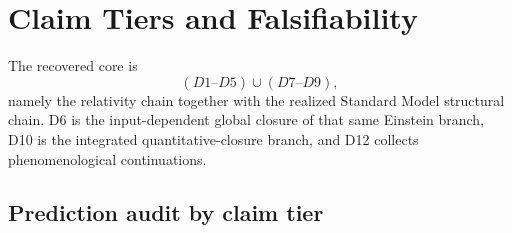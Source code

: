 \documentclass[11pt]{article}
\begin{document}
\section{Claim Tiers and Falsifiability}

The recovered core is
\[
(D1\text{--}D5)\cup(D7\text{--}D9),
\]
namely the relativity chain together with the realized Standard Model structural chain. D6 is the input-dependent global closure of that same Einstein branch, D10 is the integrated quantitative-closure branch, and D12 collects phenomenological continuations.

\subsection{Prediction audit by claim tier}

\begingroup
\footnotesize
\end{document}
